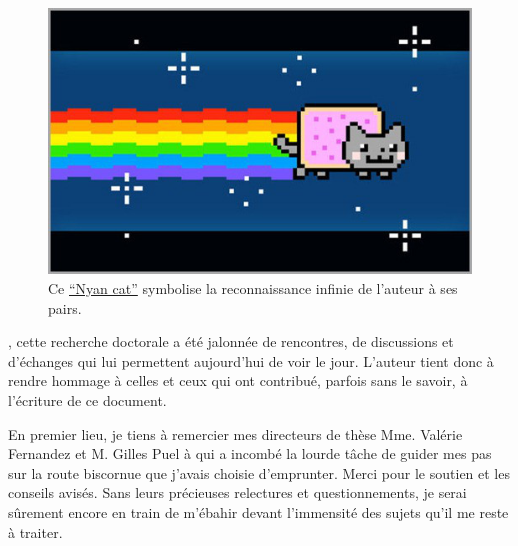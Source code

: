 


    \begin{figure}[th!]
    
       \hfill\begin{minipage}{8cm}\centering
        \includegraphics[scale=0.6]{media/nyan_cat_thumb.jpg}
        \caption*{Ce \href{https://www.youtube.com/watch?v=QH2-TGUlwu4}{``Nyan cat''} symbolise la reconnaissance infinie de l'auteur à ses pairs.}
        \end{minipage}
    \end{figure}




, cette recherche doctorale a été jalonnée de rencontres, de discussions et d'échanges qui lui permettent aujourd'hui de voir le jour. L'auteur tient donc à rendre hommage à celles et ceux qui ont contribué, parfois sans le savoir, à l'écriture de ce document.

En premier lieu, je tiens à remercier mes directeurs de thèse Mme. Valérie {\sc Fernandez} et M. Gilles {\sc Puel} à qui a incombé la lourde tâche de guider mes pas sur la route biscornue que j'avais choisie d'emprunter. Merci pour le soutien et les conseils avisés. Sans leurs précieuses relectures et questionnements, je serai sûrement encore en train de m'ébahir devant l'immensité des sujets qu'il me reste à traiter.

